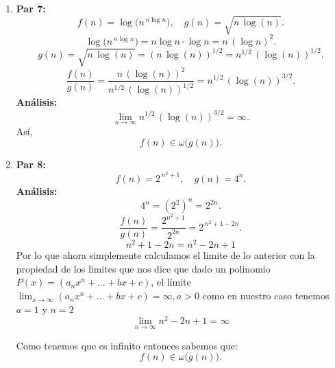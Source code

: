 \documentclass[12pt]{article}
\begin{document}
\begin{enumerate}
  \item \textbf{Par 7:}
  \[
    f(n) = \log\bigl(n^{\,n \log n}\bigr), \quad g(n) = \sqrt{n \,\log(n)}.
  \]
  \[
    \log\bigl(n^{\,n \log n}\bigr) = n \log n \cdot \log n = n\,(\log n)^2.
  \]
  \[
    g(n) = \sqrt{n\,\log(n)} = (n\,\log(n))^{1/2} = n^{1/2}\,(\log(n))^{1/2}.
  \]
  \[
    \frac{f(n)}{g(n)} = \frac{n\,(\log(n))^2}{n^{1/2}\,(\log(n))^{1/2}} = n^{1/2}\,(\log(n))^{3/2}.
  \]
  \textbf{Análisis:}
  \[
    \lim_{n \to \infty} n^{1/2}\,(\log(n))^{3/2} = \infty.
  \]
  Así,
  \[
    f(n) \in \omega\bigl(g(n)\bigr).
  \]

  \item \textbf{Par 8:}
  \[
    f(n) = 2^{\,n^2 + 1}, \quad g(n) = 4^n.
  \]
  \textbf{Análisis:}
  \[
    4^n = (2^2)^n = 2^{2n}.
  \]
  \[
    \frac{f(n)}{g(n)} = \frac{2^{n^2+1}}{2^{2n}} = 2^{\,n^2 + 1 - 2n}.
  \]
  \[
    n^2 + 1 - 2n = n^2 - 2n + 1
  \]
  Por lo que ahora simplemente calculamos el limite de lo anterior con la propiedad de los limites que nos dice que dado un polinomio \( P(x) = (a_n x^n  + \dots + bx+c) \), el límite  \(\lim_{x \to \infty} (a_n x^n  + \dots + bx+c) = \infty, a>0\) como en nuestro caso tenemos $a=1$ y $n=2$ 
  \[
  \lim_{n \to \infty} n^2 - 2n + 1 = \infty
  \]
  
  Como tenemos que es infinito entonces sabemos que:
  \[
    f(n) \in \omega\bigl(g(n)\bigr).
  \]

\end{enumerate}
\end{document}
